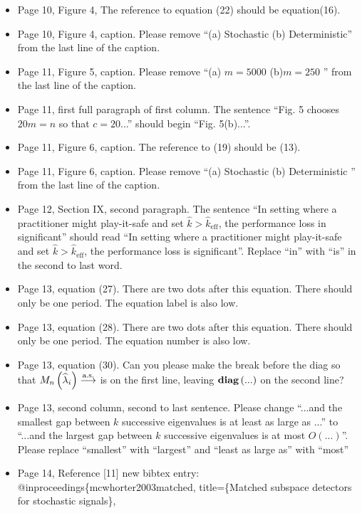 \documentclass[11pt]{article}
\begin{document}
\begin{itemize}
  \item Page 10, Figure 4, The reference to equation (22) should be equation(16).
  \item Page 10, Figure 4, caption. Please remove ``(a) Stochastic (b) Deterministic''
    from the last line of the caption.
  \item Page 11, Figure 5, caption. Please remove ``(a) $m=5000$ (b)$m=250$ ''
    from the last line of the caption.
  \item Page 11, first full paragraph of first column. The sentence ``Fig. 5 chooses
    $20m=n$ so that $c=20$...'' should begin ``Fig. 5(b)...''.
  \item Page 11, Figure 6, caption. The reference to (19) should be (13).
  \item Page 11, Figure 6, caption. Please remove ``(a) Stochastic (b) Deterministic ''
    from the last line of the caption.
  \item Page 12, Section IX, second paragraph. The sentence ``In setting where a
    practitioner might play-it-safe and set $\widehat{k}>\widehat{k}_{\text{eff}}$, the
    performance loss in significant'' should read ``In setting where a
    practitioner might play-it-safe and set $\widehat{k}>\widehat{k}_{\text{eff}}$, the
    performance loss is significant''. Replace ``in'' with ``is'' in the second to last word. 
  \item Page 13, equation (27). There are two dots after this equation. There should only
    be one period. The equation label is also low.
  \item Page 13, equation (28). There are two dots after this equation. There should only
    be one period. The equation number is also low.
  \item Page 13, equation (30). Can you please make the break before the diag so that
    $M_n\left(\widehat{\lambda}_i\right)\overset{\textrm{a.s.}}{\longrightarrow}$ is on the first line, leaving
    $\mathop{\bf diag}\left(...\right)$ on the second line?
  \item Page 13, second column, second to last sentence. Please change ``...and the
    smallest gap between $k$ successive eigenvalues is at least as large as ...'' to
    ``...and the largest gap between $k$ successive eigenvalues is at most
    $O\left(...\right)$''. Please replace ``smallest'' with ``largest'' and ``least as large as'' with ``most''
  \item Page 14, Reference [11] new bibtex entry:\\
    @inproceedings\{mcwhorter2003matched,
  title=\{Matched subspace detectors for stochastic signals\},

\end{itemize}
\end{document}
